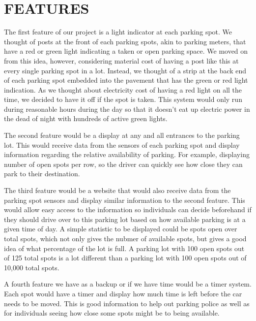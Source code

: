 \documentclass[12pt]{article}
\begin{document}
\section{FEATURES}

 
The first feature of our project is a light indicator at each parking spot. We thought of posts at the front of each parking spots, akin to parking meters, that have a red or green light indicating a taken or open parking space. We moved on from this idea, however, considering material cost of having a post like this at every single parking spot in a lot. Instead, we thought of a strip at the back end of each parking spot embedded into the pavement that has the green or red light indication. As we thought about electricity cost of having a red light on all the time, we decided to have it off if the spot is taken. This system would only run during reasonable hours during the day so that it doesn't eat up electric power in the dead of night with hundreds of active green lights.

The second feature would be a display at any and all entrances to the parking lot. This would receive data from the sensors of each parking spot and display information regarding the relative availability of parking. For example, displaying number of open spots per row, so the driver can quickly see how close they can park to their destination.

The third feature would be a website that would also receive data from the parking spot sensors and display similar information to the second feature. This would allow easy access to the information so individuals can decide beforehand if they should drive over to this parking lot based on how available parking is at a given time of day. A simple statistic to be displayed could be spots open over total spots, which not only gives the nubmer of available spots, but gives a good idea of what percentage of the lot is full. A parking lot with 100 open spots out of 125 total spots is a lot different than a parking lot with 100 open spots out of 10,000 total spots.

A fourth feature we have as a backup or if we have time would be a timer system. Each spot would have a timer and display how much time is left before the car needs to be moved. This is good information to help out parking police as well as for individuals seeing how close some spots might be to being available.
\end{document}
